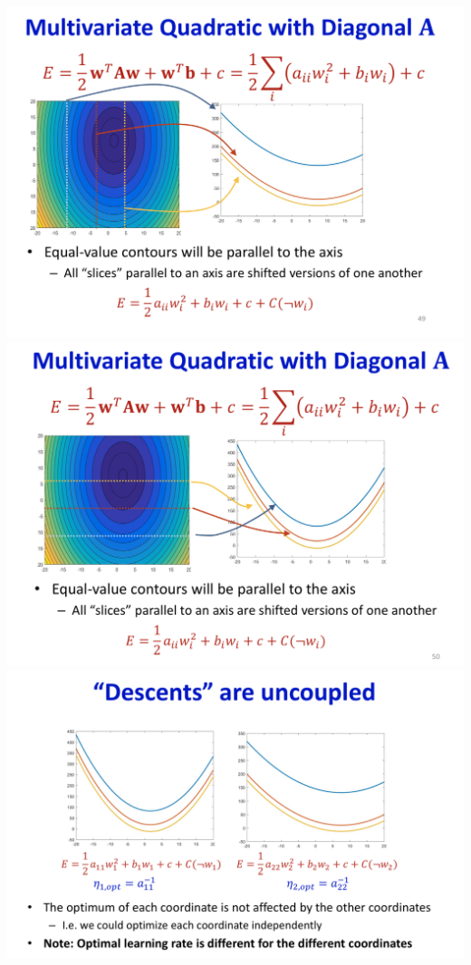 \documentclass{article}
\begin{document}
	\includegraphics[scale=0.2]{73.png}
	\includegraphics[scale=0.2]{74.png}
	\includegraphics[scale=0.2]{75.png}
	
\end{document}
